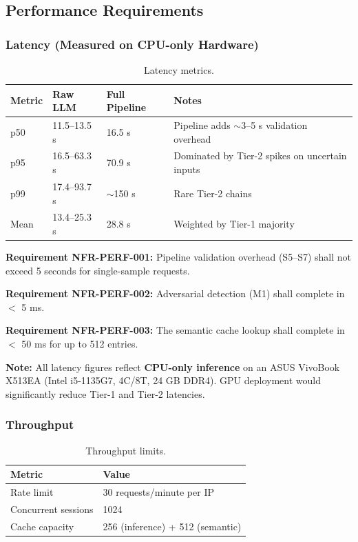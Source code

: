 \documentclass[10pt,journal,onecolumn]{IEEEtran}
\newcommand{\reqid}[1]{\textbf{#1}}
\begin{document}
\subsection{Performance Requirements}

\subsubsection{Latency (Measured on CPU-only Hardware)}
\begin{table}[t]
\caption{Latency metrics.}
\label{tab:latency}
\begin{tabularx}{\textwidth}{l X X X}
\toprule
\textbf{Metric} & \textbf{Raw LLM} & \textbf{Full Pipeline} & \textbf{Notes}\\
\midrule
p50 & 11.5--13.5 s & 16.5 s & Pipeline adds $\sim$3--5 s validation overhead\\
p95 & 16.5--63.3 s & 70.9 s & Dominated by Tier-2 spikes on uncertain inputs\\
p99 & 17.4--93.7 s & $\sim$150 s & Rare Tier-2 chains\\
Mean & 13.4--25.3 s & 28.8 s & Weighted by Tier-1 majority\\
\bottomrule
\end{tabularx}
\end{table}

\reqid{Requirement NFR-PERF-001:} Pipeline validation overhead (S5--S7) shall not exceed 5 seconds for single-sample requests.

\reqid{Requirement NFR-PERF-002:} Adversarial detection (M1) shall complete in $<$ 5 ms.

\reqid{Requirement NFR-PERF-003:} The semantic cache lookup shall complete in $<$ 50 ms for up to 512 entries.

\textbf{Note:} All latency figures reflect \textbf{CPU-only inference} on an ASUS VivoBook X513EA (Intel i5-1135G7, 4C/8T, 24 GB DDR4). GPU deployment would significantly reduce Tier-1 and Tier-2 latencies.

\subsubsection{Throughput}
\begin{table}[h]
\caption{Throughput limits.}
\label{tab:throughput}
\begin{tabularx}{\columnwidth}{l X}
\toprule
\textbf{Metric} & \textbf{Value}\\
\midrule
Rate limit & 30 requests/minute per IP\\
Concurrent sessions & 1024\\
Cache capacity & 256 (inference) + 512 (semantic)\\
\bottomrule
\end{tabularx}
\end{table}
\end{document}
